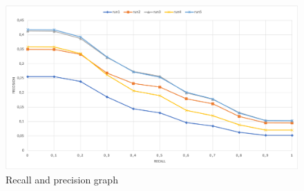 \begin{figure}[h!]
    \includegraphics[width=\textwidth]{figure/PRgraph.png}
    \caption{Recall and precision graph}
    \label{fig:recallPrecision}
  \end{figure}